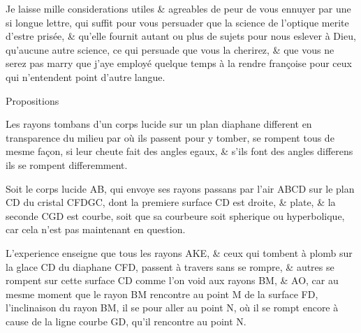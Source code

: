 \documentclass[11pt,a4paper]{article}
\begin{document}
Je laisse mille considerations \struck{\ill{}} utiles \& agreables de peur de vous ennuyer par une si longue lettre, qui suffit pour vous persuader que la science de l'optique merite d'estre prisée, \& qu'elle fournit autant ou plus de sujets pour nous eslever à Dieu, qu'aucune autre science, ce qui  persuade que vous la cherirez, \& que vous ne serez pas marry que j'aye employé quelque temps à la rendre françoise pour ceux qui n'entendent point d'autre langue.


Propositions

Les rayons tombans d'un corps lucide sur un \struck{\ill{}} plan diaphane different en transparence du milieu par où ils passent pour y tomber, se rompent tous de mesme façon, \struck{\ill{}} si leur cheute fait des angles egaux, \& s'ils font des angles differens ils se rompent \struck{\ill{}} differemment.

Soit le corps lucide AB, qui envoye ses rayons \struck{\ill{}} passans par l'air ABCD sur le plan CD du cristal CFDGC, dont la premiere surface CD est droite, \& plate, \& la seconde CGD est courbe, soit que sa courbeure soit spherique ou hyperbolique, car cela n'est pas maintenant en question.

L'experience enseigne que tous les rayons AKE, \& ceux qui tombent à plomb sur la glace CD du diaphane CFD, passent à travers sans se rompre, \&  autres se rompent sur cette surface CD comme l'on void aux rayons BM, \& AO, car au mesme moment que \struck{\ill{}} le rayon BM \struck{\ill{}} rencontre au point M de la surface FD,  l'inclinaison du rayon BM, il se  pour aller au point N, où il se \struck{\ill{}} rompt encore à cause de la ligne courbe GD, qu'il rencontre au point N.
\end{document}
